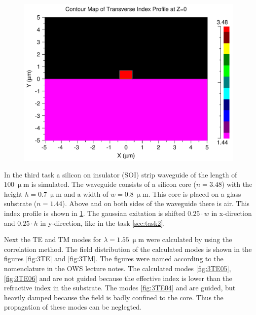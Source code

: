 \begin{figure}%
\centering
 \includegraphics[totalheight=6 cm]{Grafiken/a3_index_profile.pdf}
\caption{}%
\label{fig:index_profile_3}%
\end{figure}


In the third task a silicon on insulator (SOI) strip waveguide of the length of $100~\upmu$m is simulated. The waveguide consists of a silicon core ($n=3.48$) with the height $h=0.7~\upmu$m and a width of $w=0.8~\upmu$m. This core is placed on a glass substrate ($n=1.44$). Above and on both sides of the waveguide there is air. This index profile is shown in \ref{fig:index_profile_3}. The gaussian exitation is shifted $0.25\cdot w$ in x-direction and $0.25\cdot h$ in y-direction, like in the task \ref{sec:task2}.

Next the TE and TM modes for $\lambda = 1.55~\upmu$m were calculated by using the correlation method. The field distribution of the calculated modes is shown in the figures \ref{fig:3TE} and \ref{fig:3TM}. The figures were named according to the nomenclature in the OWS lecture notes. The calculated modes \ref{fig:3TE05}, \ref{fig:3TE06} and  are not guided because the effective index is lower than the refractive index in the substrate. The modes \ref{fig:3TE04} and  are guided, but heavily damped because the field is badly confined to the core. Thus the propagation of these modes can be neglegted.

